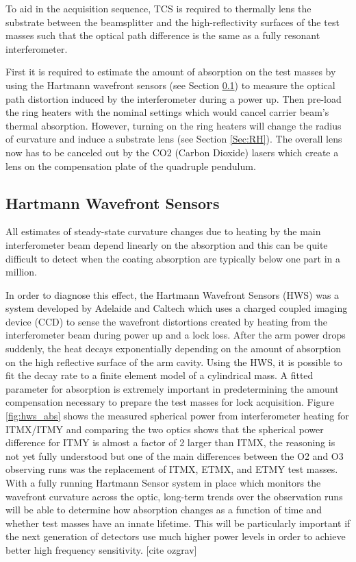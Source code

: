 	To aid in the acquisition sequence, TCS is required to thermally lens the substrate between the beamsplitter and the high-reflectivity surfaces of the test masses such that the optical path difference is the same as a fully resonant interferometer.
	
	First it is required to estimate the amount of absorption on the test masses by using the Hartmann wavefront sensors (see Section \ref{Sec:HWS}) to measure the optical path distortion induced by the interferometer during a power up.  Then pre-load the ring heaters with the nominal settings which would cancel carrier beam's thermal absorption.  However, turning on the ring heaters will change the radius of curvature and induce a substrate lens (see Section \ref{Sec:RH}).  The overall lens now has to be canceled out by the CO2 (Carbon Dioxide) lasers which create a lens on the compensation plate of the quadruple pendulum.

	\subsection{Hartmann Wavefront Sensors}\label{Sec:HWS}
	All estimates of steady-state curvature changes due to heating by the main interferometer beam depend linearly on the absorption and this can be quite difficult to detect when the coating absorption are typically below one part in a million.
	
	In order to diagnose this effect, the Hartmann Wavefront Sensors (HWS) was a system developed by Adelaide and Caltech which uses a charged coupled imaging device (CCD) to sense the wavefront distortions created by heating from the interferometer beam during power up and a lock loss.  After the arm power drops suddenly, the heat decays exponentially depending on the amount of absorption on the high reflective surface of the arm cavity.  Using the HWS, it is possible to fit the decay rate to a finite element model of a cylindrical mass.  A fitted parameter for absorption is extremely important in predetermining the amount compensation necessary to prepare the test masses for lock acquisition.  Figure \ref{fig:hws_abs} shows the measured spherical power from interferometer heating for ITMX/ITMY and comparing the two optics shows that the spherical power difference for ITMY is almost a factor of 2 larger than ITMX, the reasoning is not yet fully understood but one of the main differences between the O2 and O3 observing runs was the replacement of ITMX, ETMX, and ETMY test masses.  With a fully running Hartmann Sensor system in place which monitors the wavefront curvature across the optic, long-term trends over the observation runs will be able to determine how absorption changes as a function of time and whether test masses have an innate lifetime.  This will be particularly important if the next generation of detectors use much higher power levels in order to achieve better high frequency sensitivity. [cite ozgrav]

